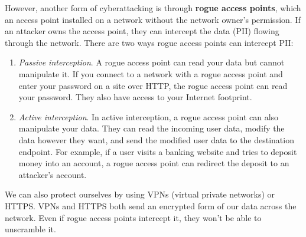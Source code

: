 \documentclass{article}
\begin{document}
  However, another form of cyberattacking is through \textbf{rogue access points}, which an access point installed on a network without the network owner's permission. If an attacker owns the access point, they can intercept the data (PII) flowing through the network. There are two ways rogue access points can intercept PII: 
  \begin{enumerate}
      \item \textit{Passive interception}. A rogue access point can read your data but cannot manipulate it. If you connect to a network with a rogue access point and enter your password on a site over HTTP, the rogue access point can read your password. They also have access to your Internet footprint. 
      \item \textit{Active interception}. In active interception, a rogue access point can also manipulate your data. They can read the incoming user data, modify the data however they want, and send the modified user data to the destination endpoint. For example, if a user visits a banking website and tries to deposit money into an account, a rogue access point can redirect the deposit to an attacker’s account. 
  \end{enumerate}

  We can also protect ourselves by using VPNs (virtual private networks) or HTTPS. VPNs and HTTPS both send an encrypted form of our data across the network. Even if rogue access points intercept it, they won’t be able to unscramble it. 
\end{document}
